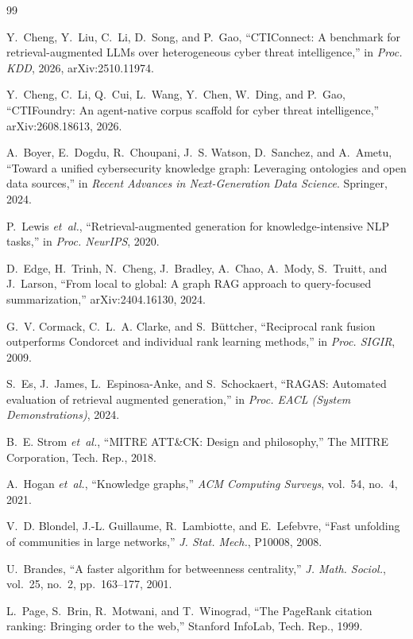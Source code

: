 \documentclass[conference]{IEEEtran}
\begin{document}
\begin{thebibliography}{99}

Y.~Cheng, Y.~Liu, C.~Li, D.~Song, and P.~Gao, ``CTIConnect: A benchmark for retrieval-augmented LLMs over heterogeneous cyber threat intelligence,'' in \emph{Proc. KDD}, 2026, arXiv:2510.11974.

Y.~Cheng, C.~Li, Q.~Cui, L.~Wang, Y.~Chen, W.~Ding, and P.~Gao, ``CTIFoundry: An agent-native corpus scaffold for cyber threat intelligence,'' arXiv:2608.18613, 2026.

A.~Boyer, E.~Dogdu, R.~Choupani, J.~S. Watson, D.~Sanchez, and A.~Ametu, ``Toward a unified cybersecurity knowledge graph: Leveraging ontologies and open data sources,'' in \emph{Recent Advances in Next-Generation Data Science}. Springer, 2024.

P.~Lewis \emph{et~al.}, ``Retrieval-augmented generation for knowledge-intensive NLP tasks,'' in \emph{Proc. NeurIPS}, 2020.

D.~Edge, H.~Trinh, N.~Cheng, J.~Bradley, A.~Chao, A.~Mody, S.~Truitt, and J.~Larson, ``From local to global: A graph RAG approach to query-focused summarization,'' arXiv:2404.16130, 2024.

G.~V. Cormack, C.~L.~A. Clarke, and S.~B\"uttcher, ``Reciprocal rank fusion outperforms Condorcet and individual rank learning methods,'' in \emph{Proc. SIGIR}, 2009.

S.~Es, J.~James, L.~Espinosa-Anke, and S.~Schockaert, ``RAGAS: Automated evaluation of retrieval augmented generation,'' in \emph{Proc. EACL (System Demonstrations)}, 2024.

B.~E. Strom \emph{et~al.}, ``MITRE ATT\&CK: Design and philosophy,'' The MITRE Corporation, Tech. Rep., 2018.

A.~Hogan \emph{et~al.}, ``Knowledge graphs,'' \emph{ACM Computing Surveys}, vol.~54, no.~4, 2021.

V.~D. Blondel, J.-L. Guillaume, R.~Lambiotte, and E.~Lefebvre, ``Fast unfolding of communities in large networks,'' \emph{J. Stat. Mech.}, P10008, 2008.

U.~Brandes, ``A faster algorithm for betweenness centrality,'' \emph{J. Math. Sociol.}, vol.~25, no.~2, pp.~163--177, 2001.

L.~Page, S.~Brin, R.~Motwani, and T.~Winograd, ``The PageRank citation ranking: Bringing order to the web,'' Stanford InfoLab, Tech. Rep., 1999.


\end{thebibliography}
\end{document}
